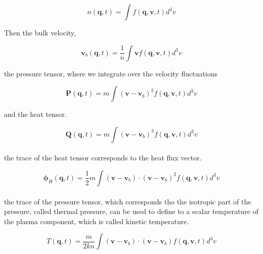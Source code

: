 \documentclass[a4paper,10pt]{report}
\begin{document}
\begin{equation}\label{velocity_moment_number_density}
    n(\mathbf{q},t)=\int f(\mathbf{q,v},t)d^3v
\end{equation}


Then the bulk velocity,

\begin{equation}\label{velocity_moment_bulc_velocity}
    \mathbf{v}_b(\mathbf{q},t)=\frac{1}{n}\int \mathbf{v} f(\mathbf{q,v},t)d^3v
\end{equation}


the pressure tensor, where we integrate over the velocity fluctuations

\begin{equation}\label{velocity_moment_pressure}
    \mathbf{P}(\mathbf{q},t)=m\int (\mathbf{v}-\mathbf{v}_b)^2 f(\mathbf{q,v},t)d^3v
\end{equation}


and the heat tensor.

\begin{equation}\label{velocity_moment_heat_tensor}
    \mathbf{Q}(\mathbf{q},t)=m\int (\mathbf{v}-\mathbf{v}_b)^3 f(\mathbf{q,v},t)d^3v
\end{equation}

\paragraph*{}
the trace of the heat tensor corresponds to the heat flux vector.

\begin{equation}\label{heat_flux}
    \mathbf{\phi}_H(\mathbf{q},t)=\frac{1}{2} m\int (\mathbf{v}-\mathbf{v}_b)\cdot(\mathbf{v}-\mathbf{v}_b)^2 f(\mathbf{q,v},t)d^3v
\end{equation}

\paragraph*{}
the trace of the pressure tensor, which corresponds tho the isotropic part of the pressure, called thermal pressure, can be used to define to a scalar temperature of the plasma component, which is called kinetic temperature.

\begin{equation}\label{kinetic_temperature}
    T(\mathbf{q},t)=\frac{m}{2kn}\int (\mathbf{v}-\mathbf{v}_b) \cdot (\mathbf{v}-\mathbf{v}_b) f(\mathbf{q,v},t)d^3v
\end{equation}
\end{document}
